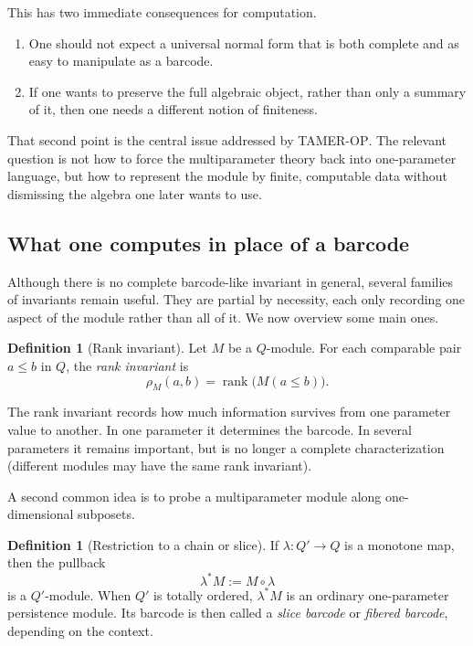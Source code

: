 \documentclass[11pt]{article}
\newcommand{\TAMER}{\textsc{TAMER-OP}}
\theoremstyle{definition}
\newtheorem{defn}[theorem]{Definition}
\theoremstyle{remark}
\begin{document}
This has two immediate consequences for computation.

\begin{enumerate}[label=(\roman*)]
    \item One should not expect a universal normal form that is both complete and as easy to manipulate as a barcode.
    \item If one wants to preserve the full algebraic object, rather than only a summary of it, then one needs a different notion of finiteness.
\end{enumerate}

That second point is the central issue addressed by \TAMER{}. The relevant question is not how to force the multiparameter theory back into one-parameter language, but how to represent the module by finite, computable data without dismissing the algebra one later wants to use.

\subsection{What one computes in place of a barcode}

Although there is no complete barcode-like invariant in general, several families of invariants remain useful. They are partial by necessity, each only recording one aspect of the module rather than all of it. We now overview some main ones.

\begin{defn}[Rank invariant]
Let $M$ be a $Q$-module. For each comparable pair $a \leq b$ in $Q$, the \emph{rank invariant} is
\[
\rho_M(a,b) = \operatorname{rank}\bigl(M(a \leq b)\bigr).
\]
\end{defn}

The rank invariant records how much information survives from one parameter value to another. In one parameter it determines the barcode. In several parameters it remains important, but is no longer a complete characterization (different modules may have the same rank invariant).

A second common idea is to probe a multiparameter module along one-dimensional subposets.

\begin{defn}[Restriction to a chain or slice]
If $\lambda : Q' \to Q$ is a monotone map, then the pullback
\[
\lambda^* M := M \circ \lambda
\]
is a $Q'$-module. When $Q'$ is totally ordered, $\lambda^*M$ is an ordinary one-parameter persistence module. Its barcode is then called a \emph{slice barcode} or \emph{fibered barcode}, depending on the context.
\end{defn}
\end{document}
